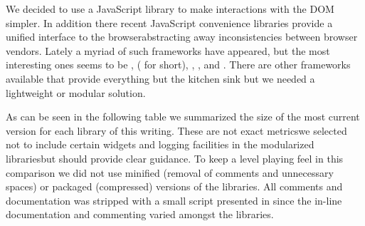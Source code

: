 We decided to use a JavaScript library to make interactions with the DOM
simpler. In addition there recent JavaScript convenience libraries provide a
unified interface to the browser\dash{}abstracting away inconsistencies
between browser vendors.
Lately a myriad of such frameworks have appeared, but the most
interesting ones seems to be
,
 ( for short),
,
, and
.%
There are other frameworks available that provide everything but the kitchen
sink but we needed a lightweight or modular solution.

As can be seen in the following table we summarized the size of the most
current version for each library of this writing. These are not exact
metrics\dash{}we selected not to include certain widgets and logging facilities
in the modularized libraries\dash{}but should provide clear guidance.
To keep a level playing feel in this comparison we did not use minified
(removal of comments and unnecessary spaces) or packaged (compressed) versions
of the libraries. All comments and documentation was stripped with a small
script presented in 
since the in-line documentation and commenting varied amongst the libraries.



